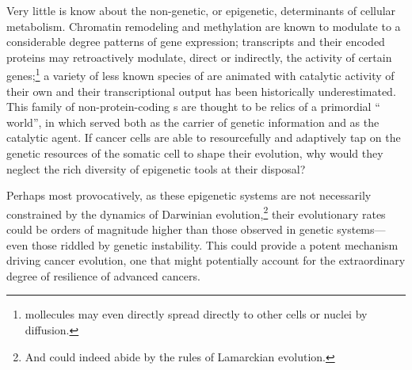 Very little is know about the non-genetic, or epigenetic, determinants of
cellular metabolism.  Chromatin remodeling and  methylation are
known to modulate to a considerable degree patterns of gene expression;
 transcripts and their encoded proteins may retroactively
modulate, direct or indirectly, the activity of certain
genes;\footnote{ mollecules may even directly spread directly to
  other cells or nuclei by diffusion.} a variety of less known species of
 are animated with catalytic activity of their own and their
transcriptional output has been historically
underestimated.\cite{huttenhofer_principles_2006,ptashne_use_2007}  This family
of non-protein-coding s are thought to be relics of a primordial
`` world'', in which  served both as the carrier
of genetic information and as the catalytic agent.  If cancer cells are able to
resourcefully and adaptively tap on the genetic resources of the somatic cell to
shape their evolution, why would they neglect the rich diversity of epigenetic
tools at their disposal?

Perhaps most provocatively, as these epigenetic systems are not necessarily
constrained by the dynamics of Darwinian evolution,\footnote{And could indeed
  abide by the rules of Lamarckian evolution.} their evolutionary rates could be
orders of magnitude higher than those observed in genetic systems---even those
riddled by genetic instability.  This could provide a potent mechanism driving
cancer evolution, one that might potentially account for the extraordinary
degree of resilience of advanced cancers.


\medskip




